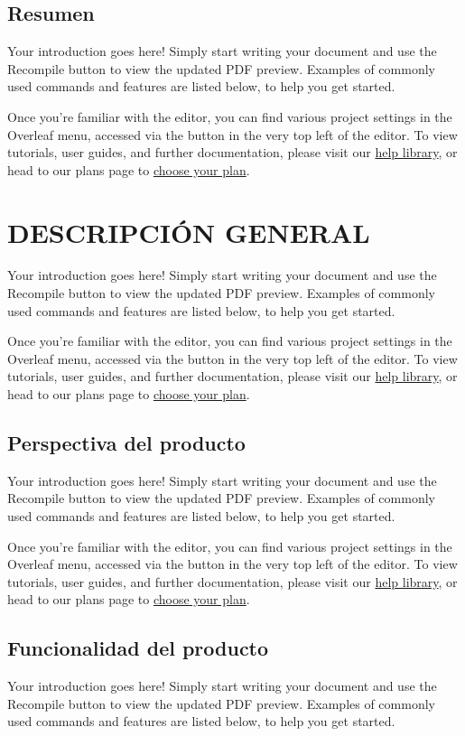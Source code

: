 \documentclass {article}
\begin{document}
\subsection{Resumen}
Your introduction goes here! Simply start writing your document and use the Recompile button to view the updated PDF preview. Examples of commonly used commands and features are listed below, to help you get started.

Once you're familiar with the editor, you can find various project settings in the Overleaf menu, accessed via the button in the very top left of the editor. To view tutorials, user guides, and further documentation, please visit our \href{https://www.overleaf.com/learn}{help library}, or head to our plans page to \href{https://www.overleaf.com/user/subscription/plans}{choose your plan}.

\newpage
\section{DESCRIPCIÓN GENERAL}
Your introduction goes here! Simply start writing your document and use the Recompile button to view the updated PDF preview. Examples of commonly used commands and features are listed below, to help you get started.

Once you're familiar with the editor, you can find various project settings in the Overleaf menu, accessed via the button in the very top left of the editor. To view tutorials, user guides, and further documentation, please visit our \href{https://www.overleaf.com/learn}{help library}, or head to our plans page to \href{https://www.overleaf.com/user/subscription/plans}{choose your plan}.
\subsection{Perspectiva del producto}
Your introduction goes here! Simply start writing your document and use the Recompile button to view the updated PDF preview. Examples of commonly used commands and features are listed below, to help you get started.

Once you're familiar with the editor, you can find various project settings in the Overleaf menu, accessed via the button in the very top left of the editor. To view tutorials, user guides, and further documentation, please visit our \href{https://www.overleaf.com/learn}{help library}, or head to our plans page to \href{https://www.overleaf.com/user/subscription/plans}{choose your plan}.
\subsection{Funcionalidad del producto}
Your introduction goes here! Simply start writing your document and use the Recompile button to view the updated PDF preview. Examples of commonly used commands and features are listed below, to help you get started.
\end{document}
